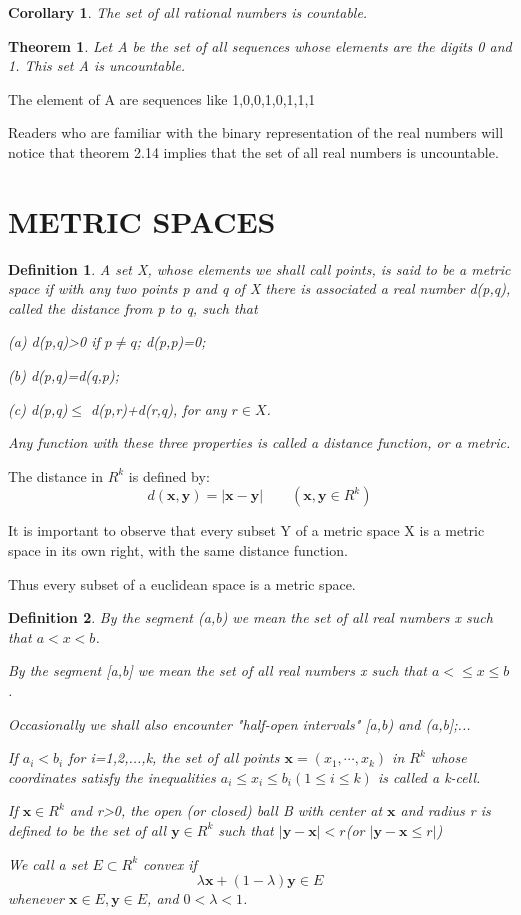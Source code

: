 \documentclass{article}
\newtheorem{defi}{Definition}
\newtheorem{theo}{Theorem}
\newtheorem{coro}{Corollary}
\begin{document}
\begin{coro}
	The set of all rational numbers is countable.
\end{coro}

\begin{theo}
	Let A be the set of all sequences whose elements are the digits 0 and 1. This set A is uncountable.
\end{theo}
The element of A are sequences like 1,0,0,1,0,1,1,1

Readers who are familiar with the binary representation of the real numbers will notice that theorem 2.14 implies that the set of all real numbers is uncountable.

\section{METRIC SPACES}
\begin{defi}
	A set X, whose elements we shall call points, is said to be a metric space if with any two points p and q of X there is associated a real number d(p,q), called the distance from p to q, such that
	
	(a) d(p,q)>0 if $ p\neq q $; d(p,p)=0;
	
	(b) d(p,q)=d(q,p);
	
	(c) d(p,q)$ \le $ d(p,r)+d(r,q), for any $ r\in X $.
	
	Any function with these three properties is called a distance function, or a metric.		

\end{defi}

The distance in $ R^k $ is defined by:
\[
d(\mathbf{x},\mathbf{y})=|\mathbf{x-y}|\qquad (\mathbf{x,y}\in R^k)
\]

It is important to observe that every subset Y of a metric space X is a metric space in its own right, with the same distance function.

Thus every subset of a euclidean space is a metric space.

\begin{defi}
	By the segment (a,b) we mean the set of all real numbers x such that $ a<x<b $.
	
	By the segment [a,b] we mean the set of all real numbers x such that $ a<\le x\le b $.	
	
	Occasionally we shall also encounter "half-open intervals" [a,b) and (a,b];...
	
	If $ a_i<b_i $ for i=1,2,...,k, the set of all points $\mathbf{x}= (x_1,\cdots,x_k) $ in $ R^k $ whose coordinates satisfy the inequalities $ a_i\le x_i\le b_i (1\le i\le k)$ is called a k-cell.
	
	If $ \mathbf{x}\in R^k $ and r>0, the open (or closed) ball B with center at $ \mathbf{x} $ and radius r is defined to be the set of all $ \mathbf{y}\in R^k $ such that $ |\mathbf{y-x}|<r $(or $ |\mathbf{y-x}\le r| $)
	
	We call a set $ E\subset R^k $ convex if
	\[
	\lambda	\mathbf{x}+(1-\lambda)\mathbf{y}\in E
	\]
	whenever $ \mathbf{x}\in E,\mathbf{y}\in E $, and $ 0<\lambda<1 $.
	
\end{defi}
\end{document}
